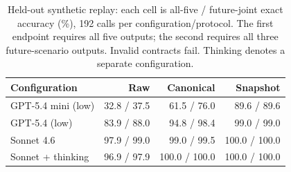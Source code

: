 \begin{table}[t]
\centering
\small
\setlength{\tabcolsep}{3pt}
\begin{tabular}{lrrr}
\toprule
Configuration & Raw & Canonical & Snapshot \\
\midrule
GPT-5.4 mini (low) & 32.8 / 37.5 & 61.5 / 76.0 & 89.6 / 89.6 \\
GPT-5.4 (low) & 83.9 / 88.0 & 94.8 / 98.4 & 99.0 / 99.0 \\
Sonnet 4.6 & 97.9 / 99.0 & 99.0 / 99.5 & 100.0 / 100.0 \\
Sonnet + thinking & 96.9 / 97.9 & 100.0 / 100.0 & 100.0 / 100.0 \\
\bottomrule
\end{tabular}
\caption{Held-out synthetic replay: each cell is all-five / future-joint exact accuracy (\%), 192 calls per configuration/protocol. The first endpoint requires all five outputs; the second requires all three future-scenario outputs. Invalid contracts fail. Thinking denotes a separate configuration.}
\label{tab:main}
\end{table}

